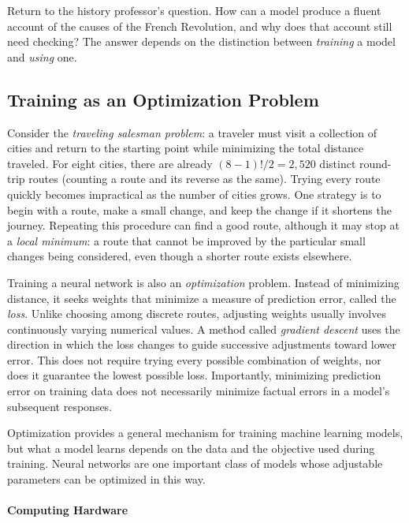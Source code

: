 \documentclass[11pt]{article}
\begin{document}
Return to the history professor's question. How can a model
produce a fluent account of the causes of the French
Revolution, and why does that account still need checking?
The answer depends on the distinction between
\emph{training} a model and \emph{using} one.

\subsection{Training as an Optimization Problem}\label{sec:optimization}

Consider the \emph{traveling salesman problem}: a traveler must
visit a collection of cities and return to the starting point
while minimizing the total distance traveled. For eight cities,
there are already $(8-1)!/2 = 2{,}520$ distinct round-trip routes (counting a
route and its reverse as the same). Trying every route quickly
becomes impractical as the number of cities grows. One strategy
is to begin with a route, make a small change, and keep the
change if it shortens the journey. Repeating this procedure can
find a good route, although it may stop at a \emph{local minimum}:
a route that cannot be improved by the particular small changes
being considered, even though a shorter route exists elsewhere.

Training a neural network is also an \emph{optimization} problem.
Instead of minimizing distance, it seeks weights that minimize
a measure of prediction error, called the \emph{loss}. Unlike
choosing among discrete routes, adjusting weights usually
involves continuously varying numerical values. A method called
\emph{gradient descent} uses the direction in which the loss
changes to guide successive adjustments toward lower error.
This does not require trying every possible combination of
weights, nor does it guarantee the lowest possible loss.
Importantly, minimizing prediction error on training data does not necessarily minimize factual errors in a model's subsequent responses.


\FloatBarrier

Optimization provides a general mechanism for training machine learning models, but what a model learns depends on the data and the objective used during training. Neural networks are one important class of models whose adjustable parameters can be optimized in this way.


\paragraph{Computing Hardware}
\end{document}
